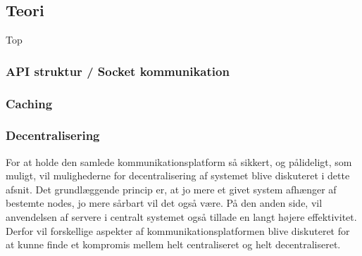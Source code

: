 

\subsection{Teori}
Top

\subsubsection{API struktur / Socket kommunikation}

\subsubsection{Caching}

\subsubsection{Decentralisering}
For at holde den samlede kommunikationsplatform så sikkert, og pålideligt, som muligt, vil mulighederne for decentralisering af systemet blive diskuteret i dette afsnit.
Det grundlæggende princip er, at jo mere et givet system afhænger af bestemte nodes, jo mere sårbart vil det også være. På den anden side, vil anvendelsen af servere i centralt systemet også tillade en langt højere effektivitet. Derfor vil forskellige aspekter af kommunikationsplatformen blive diskuteret for at kunne finde et kompromis mellem helt centraliseret og helt decentraliseret.

